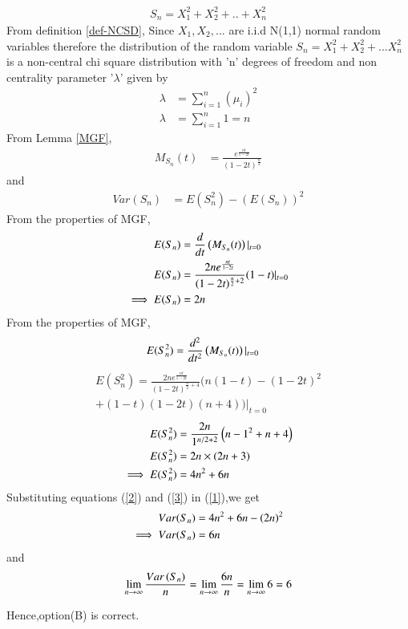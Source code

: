 \documentclass[journal,12pt,twocolumn]{IEEEtran}
\begin{document}
\begin{align}
    S_{n}=X_{1}^{2}+X_{2}^2+..+X_{n}^2
\end{align}
From definition \ref{def-NCSD},
Since $X_{1},X_{2},...$ are i.i.d N(1,1) normal random variables therefore the distribution of the random variable $S_{n}=X_{1}^{2}+X_{2}^{2}+...X_{n}^{2}$ is a non-central chi square distribution with 'n' degrees of freedom and non centrality parameter '$\lambda$' given by
\begin{align}
    \lambda&=\sum_{i=1}^{n}(\mu_{i})^{2}
    \\\lambda&=\sum_{i=1}^{n}1=n
\end{align}
From Lemma \ref{MGF},
\begin{align}
    M_{S_{n}}(t)&=\frac{e^{\frac{n t}{1-2t}}}{(1-2t)^{\frac{n}{2}}}
\end{align}
and
\begin{align}
Var(S_{n})&=E(S_{n}^2)-(E(S_{n}))^2
\label{1}
\end{align}
From the properties of MGF,
\begin{align}
 E(S_{n})&=\frac{d}{dt}\left(M_{S_{n}}(t)\right)|_{t=0}
\\E(S_{n})&=\frac{2ne^{\frac{nt}{1-2t}}}{(1-2t)^{\frac{n}{2}+2}}(1-t)|_{t=0}
\\\implies  E(S_{n})&=2n \label{2}
\end{align}
From the properties of MGF,
\begin{align}
  E(S_{n}^2)&=\frac{d^{2}}{dt^{2}}\left(M_{S_{n}}(t)\right)|_{t=0}
\end{align}
\begin{multline}
 E(S_{n}^2)=\frac{2ne^{\frac{nt}{1-2t}}}{(1-2t)^{\frac{n}{2}+4}}(n(1-t)-(1-2t)^{2}\\
 +(1-t)(1-2t)(n+4))|_{t=0}
\end{multline}
\begin{align}
E(S_{n}^2)&=\frac{2n}{1^{n/2+2}}\left(n-1^2+n+4\right)
\\E(S_{n}^2)&=2n\times(2n+3)
\\\implies E(S_{n}^2)&=4n^{2}+6n
\label{3}
\end{align}
Substituting equations (\ref{2}) and (\ref{3}) in (\ref{1}),we get 
\begin{align}
    Var(S_{n})&=4n^{2}+6n-\left(2n\right)^{2}
\\ \implies Var(S_{n})&=6n
\end{align}
and
$$\lim_{n \to \infty}{\frac{Var\left(S_{n}\right)}{n}}=\lim_{n \to \infty}{\frac{6n}{n}}=\lim_{n \to \infty}{6}=6$$

Hence,option(B) is correct.
    
 
\end{document}
